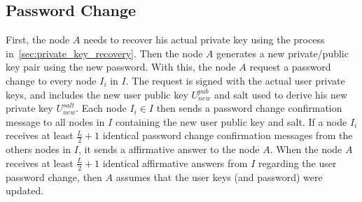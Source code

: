\subsection{Password Change}

First, the node $A$ needs to recover his actual private key using the process
in~\ref{sec:private_key_recovery}. Then the node $A$ generates a new private/public
key pair using the new password.  With this, the node $A$ request a
password change to every node $I_i$ in $I$. The request is signed with the
actual user private keys, and includes the new user public key $U^{pub}_{new}$
and salt used to derive his new private key $U^{salt}_{new}$. 
Each node $I_i \in I$ then sends a password change confirmation message to all nodes
in $I$ containing the new user public key and salt. If a node $I_i$ receives at
least $\frac{L}{2} + 1$ identical password change confirmation messages from
the others nodes in $I$, it sends a affirmative answer to the node $A$.
 When the node $A$ receives at least $\frac{L}{2} + 1$ identical affirmative
answers from $I$ regarding the user password change, then $A$ assumes that the
user keys (and password) were updated.

